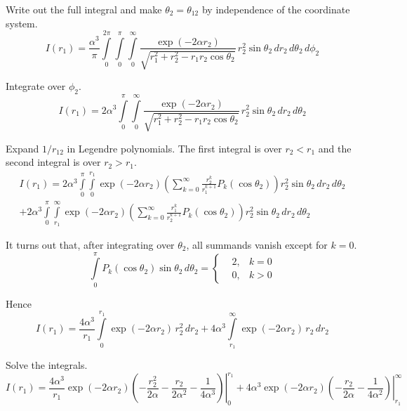 \documentclass[12pt]{article}
\begin{document}
\noindent
Write out the full integral and make $\theta_2=\theta_{12}$ by independence of the coordinate system.
\begin{equation*}
I(r_1)=\frac{\alpha^3}{\pi}
\int\limits_0^{2\pi}\int\limits_0^\pi\int\limits_0^\infty
\frac{\exp(-2\alpha r_2)}{\sqrt{r_1^2+r_2^2-r_1r_2\cos\theta_2}}
\,r_2^2\sin\theta_2\,dr_2\,d\theta_2\,d\phi_2
\end{equation*}

\noindent
Integrate over $\phi_2$.
\begin{equation*}
I(r_1)=
2\alpha^3\int\limits_0^\pi\int\limits_0^\infty
\frac{\exp(-2\alpha r_2)}{\sqrt{r_1^2+r_2^2-r_1r_2\cos\theta_2}}
\,r_2^2\sin\theta_2\,dr_2\,d\theta_2
\end{equation*}

\noindent
Expand $1/r_{12}$ in Legendre polynomials.
The first integral is over $r_2<r_1$ and the second integral is over $r_2>r_1$.
\begin{multline*}
I(r_1)=
2\alpha^3\int\limits_0^\pi\int\limits_0^{r_1}
\exp(-2\alpha r_2)
\left(\sum_{k=0}^\infty\frac{r_2^k}{r_1^{k+1}}P_k(\cos\theta_2)\right)
r_2^2\sin\theta_2\,dr_2\,d\theta_2
\\
+2\alpha^3\int\limits_0^\pi\int\limits_{r_1}^\infty
\exp(-2\alpha r_2)
\left(\sum_{k=0}^\infty\frac{r_1^k}{r_2^{k+1}}P_k(\cos\theta_2)\right)
r_2^2\sin\theta_2\,dr_2\,d\theta_2
\end{multline*}

\noindent
It turns out that, after integrating over $\theta_2$, all summands vanish except for $k=0$.
\begin{equation*}
\int\limits_0^\pi P_k(\cos\theta_2)\sin\theta_2\,d\theta_2=
\left\{
\begin{aligned}
&2, & k=0
\\
&0, & k>0
\end{aligned}\right.
\tag{5}
\end{equation*}

\noindent
Hence
\begin{equation*}
I(r_1)=
\frac{4\alpha^3}{r_1}\int\limits_0^{r_1}\exp(-2\alpha r_2)\,r_2^2\,dr_2
+4\alpha^3\int\limits_{r_1}^\infty\exp(-2\alpha r_2)\,r_2\,dr_2
\end{equation*}

\noindent
Solve the integrals.
\begin{equation*}
I(r_1)=
\frac{4\alpha^3}{r_1}
\left.
\exp(-2\alpha r_2)\left(-\frac{r_2^2}{2\alpha}-\frac{r_2}{2\alpha^2}-\frac{1}{4\alpha^3}
\right)\right|_0^{r_1}
+4\alpha^3\left.\exp(-2\alpha r_2)\left(-\frac{r_2}{2\alpha}-\frac{1}{4\alpha^2}\right)\right|_{r_1}^\infty
\end{equation*}
\end{document}
